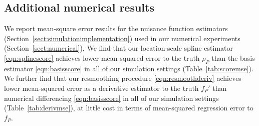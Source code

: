 \documentclass[aos]{imsart}
\newcommand{\R}{\mathbb{R}}
\begin{document}
%	


\subsection{Additional numerical results}
	\label{sect:nuisancemse}

 We report mean-square error results for the nuisance function estimators (Section~\ref{sect:simulationimplementation}) used in our numerical experiments (Section~\ref{sect:numerical}). We find that our location-scale spline estimator \eqref{eqn:splinescore} achieves lower mean-squared error to the truth $\rho_P$ than the basis estimator \eqref{eqn:basisscore} in all of our simulation settings (Table~\ref{tab:scoremse}). We further find that our resmoothing procedure \eqref{eqn:resmoothderiv} achieves lower mean-squared error as a derivative estimator to the truth $f_P'$ than numerical differencing \eqref{eqn:basisscore} in all of our simulation settings (Table~\ref{tab:derivmse}), at little cost in terms of mean-squared regression error to $f_P$.
\end{document}
